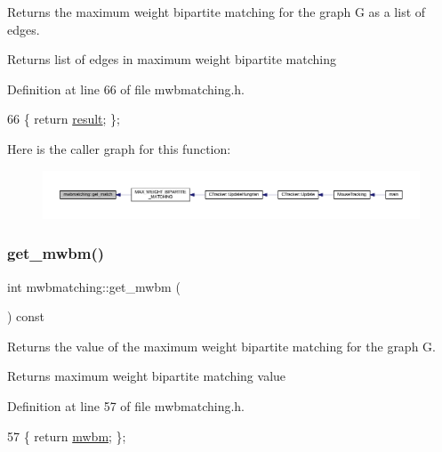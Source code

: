 Returns the maximum weight bipartite matching for the graph G as a list of edges.

\begin{DoxyReturn}{Returns}
list of edges in maximum weight bipartite matching 
\end{DoxyReturn}


Definition at line 66 of file mwbmatching.\+h.


\begin{DoxyCode}
66 \{ \textcolor{keywordflow}{return} \mbox{\hyperlink{classmwbmatching_aa6483fb0f23c87f29bb08f7abff80144}{result}}; \};
\end{DoxyCode}
Here is the caller graph for this function\+:\nopagebreak
\begin{figure}[H]
\begin{center}
\leavevmode
\includegraphics[width=350pt]{classmwbmatching_a30af3917c3d7257e4c13f0634c41d39d_icgraph}
\end{center}
\end{figure}
\mbox{\label{classmwbmatching_a19c5144f8a7c44e238743e6eaff8c228}} 
\subsubsection{\texorpdfstring{get\+\_\+mwbm()}{get\_mwbm()}}
{\footnotesize\ttfamily int mwbmatching\+::get\+\_\+mwbm (\begin{DoxyParamCaption}{ }\end{DoxyParamCaption}) const\hspace{0.3cm}{\ttfamily [inline]}}

Returns the value of the maximum weight bipartite matching for the graph G.

\begin{DoxyReturn}{Returns}
maximum weight bipartite matching value 
\end{DoxyReturn}


Definition at line 57 of file mwbmatching.\+h.


\begin{DoxyCode}
57 \{ \textcolor{keywordflow}{return} \mbox{\hyperlink{classmwbmatching_a80e73b4ab7162ea265c48a93199fc172}{mwbm}}; \};
\end{DoxyCode}
\mbox{\label{classmwbmatching_acb2171f09442f1d4170eaed5dc213865}} 
